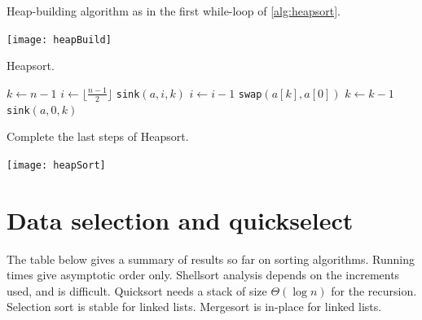 \begin{Boxample}\label{ex:heapbuild}
Heap-building algorithm as in the first while-loop of \cref{alg:heapsort}.
\begin{center}
\texttt{[image: heapBuild]}
\end{center}
\end{Boxample}

\begin{algorithm}[H]
  \caption{Heapsort.}
  \label{alg:heapsort}
\begin{algorithmic}[1]
\State $k \gets n-1$ 
\State $i \gets \lfloor \frac{n-1}{2} \rfloor $
	\State \texttt{sink}$(a, i, k)$ 
	\State $i\gets i - 1$
\EndWhile {}
	\State \texttt{swap}$(a[k], a[0])$
	\State $k \gets k - 1$
	\State \texttt{sink}$(a, 0, k)$ 
\EndWhile
\State {}
\EndFunction  
\end{algorithmic}
\end{algorithm}

\begin{Boxample}[0] Complete the last steps of Heapsort.
\begin{center}
\texttt{[image: heapSort]}
\end{center}
\end{Boxample}



\chapter{Data selection and quickselect} %
\label{sec:qselect}

The table below gives a summary of results so far on sorting algorithms.
Running times give asymptotic order only. 
Shellsort analysis depends on the increments used, and is difficult. 
Quicksort needs a stack of size $\Theta(\log n)$ for the recursion. 
Selection sort is stable for linked lists. 
Mergesort is in-place for linked lists.

